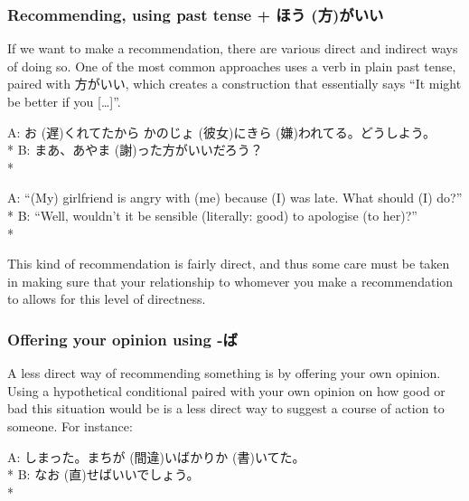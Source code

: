 \documentclass[11pt, b5paper, twoside, openright, onecolumn]{book}
\makeatletter
\newcommand*{\rubystack}[2]{{\relscale{0.5}%
  \begin{tabular}[b]{@{}c@{}}%
    {#1}\\%
   {\textscale{2}{#2}}%
  \end{tabular}}%
}
\DeclareRobustCommand*{\ruby}[2]{%
  \mbox{%
    \setlength{\parskip}{0ex}%
    \BeginAccSupp{method=pdfstringdef,ActualText={#1}}%
      \rubystack{\phantom{#2}}{#1}%
      \llap{%
        \rubystack{#2}{\phantom{#1}}%
      }%
    \EndAccSupp{}%
  }%
}
\renewcommand*{\ruby}[2]{#2 (#1)}%
\newenvironment{exampleblock}{
\setlength{\parindent}{0.6in}
\begin{minipage}[t]{\dimexpr\textwidth-\parindent}}
{\end{minipage}}
\makeatother
\begin{document}
\subsubsection{Recommending‚ using past tense + \ruby{方}{ほう}がいい}


If we want to make a recommendation‚ there are various direct and indirect ways of doing so. One of the most common approaches uses a verb in plain past tense‚ paired with 方がいい‚ which creates a construction that essentially says “It might be better if you […]”.

\vspace{0.4cm}
\begin{exampleblock}
A: \ruby{遅}{お}くれてたから \ruby{彼女}{かのじょ}に\ruby{嫌}{きら}われてる。どうしよう。 \\* 
B: まあ、\ruby{謝}{あやま}った方がいいだろう？ \\* 
\end{exampleblock}
\vspace{0.2cm}

\begin{exampleblock}
A: “(My) girlfriend is angry with (me) because (I) was late. What should (I) do?” \\* 
B: “Well‚ wouldn’t it be sensible (literally: good) to apologise (to her)?” \\* 
\end{exampleblock}
\vspace{0.2cm}

This kind of recommendation is fairly direct‚ and thus some care must be taken in making sure that your relationship to whomever you make a recommendation to allows for this level of directness.

\subsubsection{Offering your opinion using -ば}

A less direct way of recommending something is by offering your own opinion. Using a hypothetical conditional paired with your own opinion on how good or bad this situation would be is a less direct way to suggest a course of action to someone. For instance:

\vspace{0.4cm}
\begin{exampleblock}
A: しまった。\ruby{間違}{まちが}いばかり\ruby{書}{か}いてた。 \\* 
B: \ruby{直}{なお}せばいいでしょう。 \\* 
\end{exampleblock}
\vspace{0.2cm}
\end{document}
